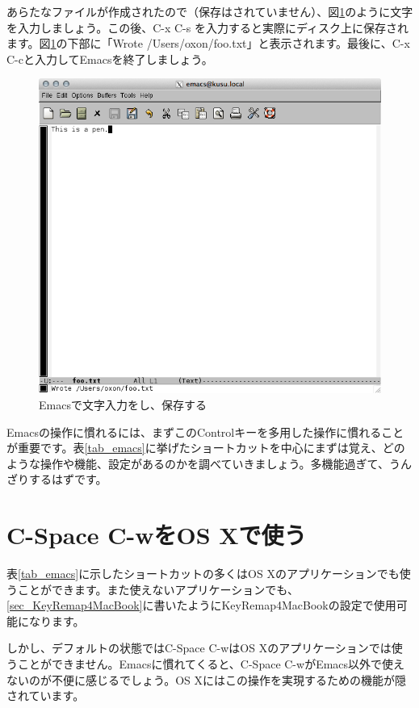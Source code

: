 あらたなファイルが作成されたので（保存はされていません）、図\ref{fig_emacs3_png}のように文字を入力しましょう。この後、C-x C-s を入力すると実際にディスク上に保存されます。図\ref{fig_emacs3_png}の下部に「Wrote /Users/oxon/foo.txt」と表示されます。最後に、C-x C-cと入力してEmacsを終了しましょう。

\begin{figure}
  \centering
  \includegraphics[scale=0.35]{fig/emacs3.png}
  \caption{Emacsで文字入力をし、保存する}
  \label{fig_emacs3_png}
\end{figure}

Emacsの操作に慣れるには、まずこのControlキーを多用した操作に慣れることが重要です。表\ref{tab_emacs}に挙げたショートカットを中心にまずは覚え、どのような操作や機能、設定があるのかを調べていきましょう。多機能過ぎて、うんざりするはずです。

\section{C-Space C-wをOS Xで使う}

表\ref{tab_emacs}に示したショートカットの多くはOS Xのアプリケーションでも使うことができます。また使えないアプリケーションでも、\ref{sec_KeyRemap4MacBook}に書いたようにKeyRemap4MacBookの設定で使用可能になります。

しかし、デフォルトの状態ではC-Space C-wはOS Xのアプリケーションでは使うことができません。Emacsに慣れてくると、C-Space C-wがEmacs以外で使えないのが不便に感じるでしょう。OS Xにはこの操作を実現するための機能が隠されています。

